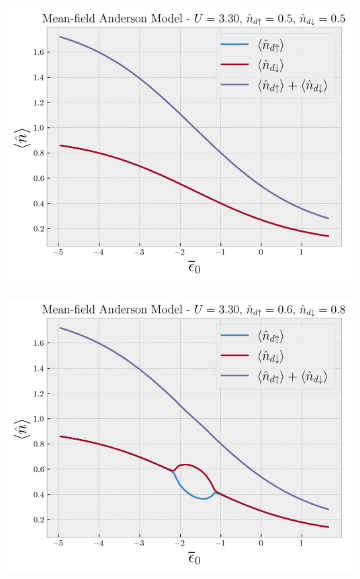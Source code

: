 \documentclass[a4paper,fleqn,12pt]{article}
\begin{document}
\begin{figure}[H]
\centering
\begin{subfigure}{.5\textwidth}
  \centering
  \includegraphics[width=\linewidth]{fig/plot-U_3.3-up_0.5-down_0.5.png}
\end{subfigure}%
\begin{subfigure}{.5\textwidth}
  \centering
  \includegraphics[width=\linewidth]{fig/plot-U_3.3-up_0.6-down_0.8.png}
\end{subfigure}
\end{figure}

\n\n\n\n
\end{document}
